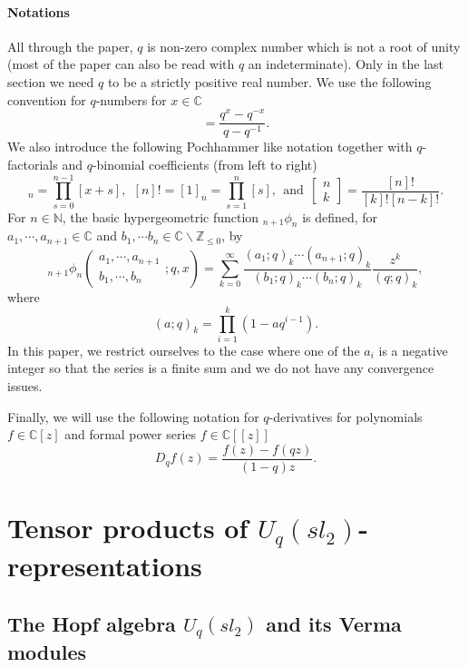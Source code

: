 \documentclass[a4paper,12pt]{article}
\numberwithin{equation}{section}
\newcommand{\C}{\mathbb{C}}
\newcommand{\Z}{\mathbb{Z}}
\newcommand{\N}{\mathbb{N}}
\newcommand{\qbinom}[2]{\begin{bmatrix}#1\\#2\end{bmatrix}}
\theoremstyle{rem}
\theoremstyle{definition}
\begin{document}
\paragraph{Notations}
All through the paper, $q$ is non-zero complex number which is not a root of unity (most of the paper can also be read with $q$ an indeterminate). Only in the last section we need $q$ to be a strictly positive real number. We use the following convention for $q$-numbers for $x\in \C$
\begin{equation}
[x]=\frac{q^x-q^{-x}}{q-q^{-1}}.
\end{equation}
We also introduce the following Pochhammer like notation together with $q$-factorials and $q$-binomial coefficients (from left to right)
\begin{equation*}
[x]_n=\prod_{s=0}^{n-1} [x+s],\ \ [n] !=[1]_n=\prod_{s=1}^{n} [s],\ \ \text{and}\ \ \qbinom{n}{k}=\frac{[n]!}{[k]![n-k]!}.
\end{equation*}
For $n\in \N$, the basic hypergeometric function ${}_{n+1}\phi_n$ is defined, for $a_1,\cdots, a_{n+1}\in \C$ and $b_1,\cdots b_n\in \C\backslash \Z_{\leq 0}$, by 
\begin{equation}\label{eq:HypergeoDef}
    {}_{n+1}\phi_n\left(\begin{array}{c} a_1,\cdots, a_{n+1}\\ b_1,\cdots ,b_n\end{array};q,x\right)=\sum_{k=0}^\infty \frac{(a_1;q)_k\cdots (a_{n+1};q)_k}{(b_1;q)_k\cdots (b_n;q)_k}\frac{z^k}{(q;q)_k},
\end{equation}
where
\begin{equation*}
    (a;q)_k=\prod_{i=1}^k(1-aq^{i-1}). 
\end{equation*}
In this paper, we restrict ourselves to the case where one of the $a_i$ is a negative integer so that the series is a finite sum and we do not have any convergence issues. 

Finally, we will use the following notation for $q$-derivatives for polynomials $f\in\C[z]$ and formal power series $f\in\C[[z]]$
\begin{equation*}
D_q f(z)=\frac{f(z)-f(qz)}{(1-q)z}.
\end{equation*}


\section{Tensor products of $U_q(sl_2)$-representations}\label{sec2}

\subsection{The Hopf algebra $U_q(sl_2)$ and its Verma modules}
\end{document}
